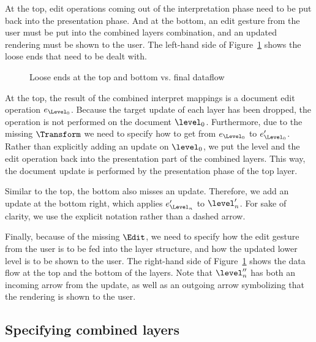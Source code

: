At the top, edit operations coming out of the interpretation phase need to be put back into the presentation phase. And at the bottom, an edit gesture from the user must be put into the combined layers combination, and an updated rendering must be shown to the user. The left-hand side of Figure~\ref{topAndBottom} shows the loose ends that need to be dealt with.

\begin{figure}\begin{center}\begin{center}
\end{center}
\caption{Loose ends at the top and bottom vs. final dataflow}\label{topAndBottom} 
\end{center}\end{figure}


At the top, the result of the combined interpret mappings is a document edit operation $e_{\Level_0}$. Because the target update of each layer has been dropped, the operation is not performed on the document $\level_0$. Furthermore, due to the missing $\Transform$ we need to specify how to get from $e_{\Level_0}$ to $e'_{\Level_0}$. Rather than explicitly adding an update on $\level_0$, we put the level and the edit operation back into the presentation part of the combined layers. This way, the document update is performed by the presentation phase of the top layer.

Similar to the top, the bottom also misses an update. Therefore, we add an update at the bottom right, which applies $e'_{\Level_n}$ to $\level'_n$. For sake of clarity, we use the explicit notation rather than a dashed arrow. 

Finally, because of the missing $\Edit$, we need to specify how the edit gesture from the user is to be fed into the layer structure, and how the updated lower level is to be shown to the user. The right-hand side of Figure~\ref{topAndBottom} shows the data flow at the top and the bottom of the layers. Note that $\level''_n$ has both an incoming arrow from the update, as well as an outgoing arrow symbolizing that the rendering is shown to the user.

\subsection{Specifying combined layers}

